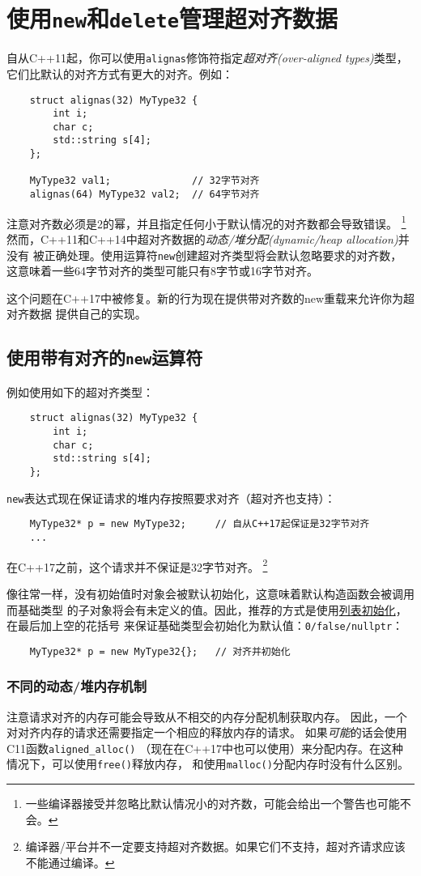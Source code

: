 \chapter{使用\texttt{new}和\texttt{delete}管理超对齐数据}\label{ch30}
自从C++11起，你可以使用\texttt{alignas}修饰符指定\emph{超对齐(over-aligned types)}类型，
它们比默认的对齐方式有更大的对齐。例如：
\begin{lstlisting}
    struct alignas(32) MyType32 {
        int i;
        char c;
        std::string s[4];
    };

    MyType32 val1;              // 32字节对齐
    alignas(64) MyType32 val2;  // 64字节对齐
\end{lstlisting}
注意对齐数必须是2的幂，并且指定任何小于默认情况的对齐数都会导致错误。
\footnote{一些编译器接受并忽略比默认情况小的对齐数，可能会给出一个警告也可能不会。}
然而，C++11和C++14中超对齐数据的\emph{动态/堆分配(dynamic/heap allocation)}并没有
被正确处理。使用运算符\texttt{new}创建超对齐类型将会默认忽略要求的对齐数，
这意味着一些64字节对齐的类型可能只有8字节或16字节对齐。

这个问题在C++17中被修复。新的行为现在提供带对齐数的new重载来允许你为超对齐数据
提供自己的实现。


\section{使用带有对齐的\texttt{new}运算符}
例如使用如下的超对齐类型：
\begin{lstlisting}
    struct alignas(32) MyType32 {
        int i;
        char c;
        std::string s[4];
    };
\end{lstlisting}
\texttt{new}表达式现在保证请求的堆内存按照要求对齐（超对齐也支持）：
\begin{lstlisting}
    MyType32* p = new MyType32;     // 自从C++17起保证是32字节对齐
    ...
\end{lstlisting}
在C++17之前，这个请求并不保证是32字节对齐。
\footnote{编译器/平台并不一定要支持超对齐数据。如果它们不支持，超对齐请求应该不能通过编译。}

像往常一样，没有初始值时对象会被默认初始化，这意味着默认构造函数会被调用而基础类型
的子对象将会有未定义的值。因此，推荐的方式是使用\hyperref[]{列表初始化}，在最后加上空的花括号
来保证基础类型会初始化为默认值：\texttt{0/false/nullptr}：
\begin{lstlisting}
    MyType32* p = new MyType32{};   // 对齐并初始化
\end{lstlisting}

\subsection{不同的动态/堆内存机制}\label{ch30.1.1}
注意请求对齐的内存可能会导致从不相交的内存分配机制获取内存。
因此，一个对对齐内存的请求还需要指定一个相应的释放内存的请求。
如果\emph{可能}的话会使用C11函数\texttt{aligned\_alloc()}
（现在在C++17中也可以使用）来分配内存。在这种情况下，可以使用\texttt{free()}释放内存，
和使用\texttt{malloc()}分配内存时没有什么区别。

